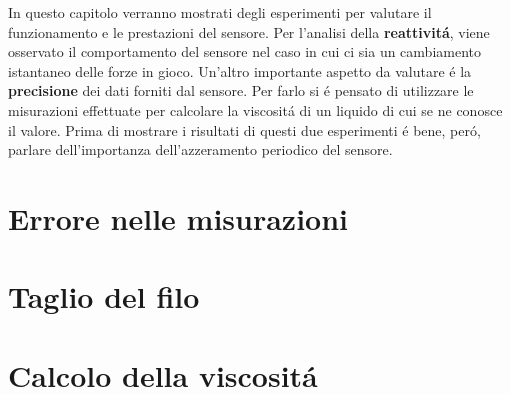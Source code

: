 In questo capitolo verranno mostrati degli esperimenti per valutare il funzionamento e le prestazioni del sensore. 
Per l'analisi della \textbf{reattivit\'{a}}, viene osservato il comportamento del sensore nel caso in cui ci sia 
un cambiamento istantaneo delle forze in gioco. 
Un'altro importante aspetto da valutare \'{e} la \textbf{precisione} dei dati forniti dal sensore. Per farlo 
si \'{e} pensato di utilizzare le misurazioni effettuate per calcolare la viscosit\'{a} di un liquido di cui se ne conosce 
il valore. 
Prima di mostrare i risultati di questi due esperimenti \'{e} bene, per\'{o}, parlare dell'importanza dell'azzeramento periodico 
del sensore.

\section{Errore nelle misurazioni}


\section{Taglio del filo}


\section{Calcolo della viscosit\'{a}}
